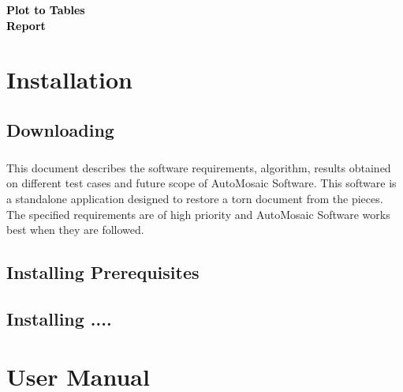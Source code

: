 \documentclass[a4paper,10pt]{scrreprt}
\date{}
\begin{document}
 

\begin{titlepage}
    \vspace*{\fill}
    \begin{center}
      \textcolor{black}{{\Huge {\textbf{Plot to Tables}}}}\\[0.5cm]
      \textcolor{black}{{\Huge {\textbf{Report}}}}\\[0.5cm]
    \end{center}
    \vspace*{\fill}
\end{titlepage}


\tableofcontents 

\chapter{Installation } 

\section{Downloading}

\paragraph{}
This document describes the software requirements, algorithm, results obtained on different test cases and future scope of AutoMosaic Software. This software is a standalone application designed to restore a torn document from the pieces. The specified requirements are of high priority and AutoMosaic Software works best when they are followed.

\section{Installing Prerequisites} 
\paragraph{}


\section{Installing ....} 




\chapter{User Manual} 
\end{document}
